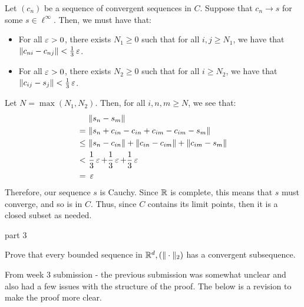 \documentclass{article}
\begin{document}
\begin{soln}
    Let $ (c_{n}) $ be a sequence of convergent sequences in $ C $.
    Suppose that $ c_{n} \rightarrow s $ for some $ s \in \ell^{\infty} $.
    Then, we must have that:
    \begin{itemize}
        \item For all $ \operatorname{\varepsilon} > 0 $, there exists $ N_{1} \geq 0 $ such that for all
            $ i, j \geq N_{1} $, we have that $ \|c_{ni} - c_{nj}\| < \frac{1}{3}\operatorname{\varepsilon} $.
        \item For all $ \operatorname{\varepsilon} > 0 $, there exists $ N_{2} \geq 0 $ such that
            for all $ i \geq N_{2} $, we have that $ \|c_{ij} - s_{j}\| < \frac{1}{3}\operatorname{\varepsilon} $.
    \end{itemize}
    Let $ N = \max(N_{1}, N_{2}) $. Then, for all $ i, n, m \geq N $, we see that:
    \begin{align*}
        & \|s_{n} - s_{m}\| \\
        = \ & \|s_{n} + c_{in} - c_{in} + c_{im} - c_{im} - s_{m}\| \\
        \leq \ & \|s_{n} - c_{in}\| + \|c_{in} - c_{im}\| + \|c_{im} - s_{m}\| \\
        < \ & \frac{1}{3}\operatorname{\varepsilon} + \frac{1}{3}\operatorname{\varepsilon} + \frac{1}{3}\operatorname{\varepsilon} \\
        = \ & \operatorname{\varepsilon}
    \end{align*}
    Therefore, our sequence $ s $ is Cauchy. Since $ \mathbb{R} $ is complete,
    this means that $ s $ must converge, and so is in $ C $.
    Thus, since $ C $ contains its limit points, then it is a closed subset as needed.
\end{soln}
\newpage

\begin{qu}
    part 3
\end{qu}

\newpage
{}

\begin{qu}
    Prove that every bounded sequence in $ \mathbb{R}^{d}, (\|\cdot\|_{2}) $ has
    a convergent subsequence.
\end{qu}

From week 3 submission - the previous submission was somewhat unclear and also had a few issues
with the structure of the proof. The below is a revision to make the proof more clear.
\end{document}
